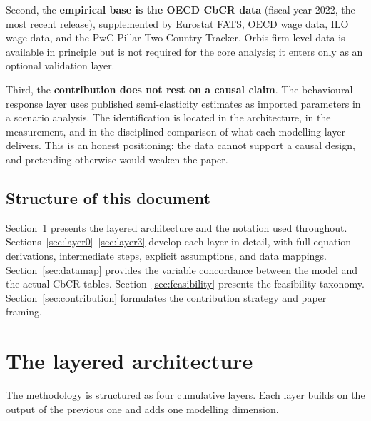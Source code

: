 \documentclass[11pt,a4paper]{article}
\begin{document}
Second, the \textbf{empirical base is the OECD CbCR data} (fiscal year 2022, the most recent release), supplemented by Eurostat FATS, OECD wage data, ILO wage data, and the PwC Pillar Two Country Tracker. Orbis firm-level data is available in principle but is not required for the core analysis; it enters only as an optional validation layer.

Third, the \textbf{contribution does not rest on a causal claim}. The behavioural response layer uses published semi-elasticity estimates as imported parameters in a scenario analysis. The identification is located in the architecture, in the measurement, and in the disciplined comparison of what each modelling layer delivers. This is an honest positioning: the data cannot support a causal design, and pretending otherwise would weaken the paper.

\subsection{Structure of this document}\label{sec:docstructure}

Section~\ref{sec:architecture} presents the layered architecture and the notation used throughout. Sections~\ref{sec:layer0}--\ref{sec:layer3} develop each layer in detail, with full equation derivations, intermediate steps, explicit assumptions, and data mappings. Section~\ref{sec:datamap} provides the variable concordance between the model and the actual CbCR tables. Section~\ref{sec:feasibility} presents the feasibility taxonomy. Section~\ref{sec:contribution} formulates the contribution strategy and paper framing.

\section{The layered architecture}\label{sec:architecture}

The methodology is structured as four cumulative layers. Each layer builds on the output of the previous one and adds one modelling dimension.
\end{document}
